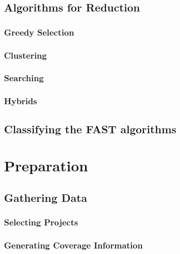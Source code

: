 \documentclass[a4paper,10pt]{article}
\begin{document}
\subsection{Algorithms for Reduction}

\subsubsection{Greedy Selection}


\subsubsection{Clustering}


\subsubsection{Searching}

\subsubsection{Hybrids}

\subsection{Classifying the FAST algorithms}

\section{Preparation}

\subsection{Gathering Data}

\subsubsection{Selecting Projects}


\subsubsection{Generating Coverage Information}

\end{document}
